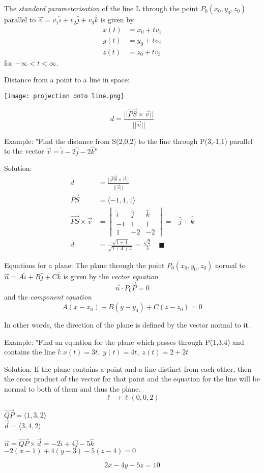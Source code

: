 \documentclass[12pt]{article}
\begin{document}
The \emph{standard parameterisation} of the line L through the point $P_0 (x_0, y_0, z_0)$ parallel to $\vec{v} = v_1 \hat{i} + v_2 \hat{j} + v_3 \hat{k}$ is given by 
\begin{align*}
    x(t) &= x_0 + tv_1\\
    y(t) &= y_0 + tv_2\\
    z(t) &= z_0 + tv_3
\end{align*}
for $-\infty < t < \infty$.

Distance from a point to a line in space:
\begin{center}
    \texttt{[image: projection onto line.png]}
\end{center}
$$d = \frac{||\vec{PS} \times \vec{v}||}{||\vec{v}||}$$

Example:
"Find the distance from S(2,0,2) to the line through P(3,-1,1) parallel to the vector $\vec{v} = \hat{i} - 2\hat{j} - 2\hat{k}$"

Solution:
\begin{align*}
    d &= \frac{||\vec{PS} \times \vec{v}||}{||\vec{v}||}\\
    \vec{PS} &= \langle -1,1,1\rangle\\
    \vec{PS} \times \vec{v} &= \begin{vmatrix}
        \hat{i} & \hat{j} & \hat{k}\\
        -1 & 1 & 1\\
        1 & -2 & -2
    \end{vmatrix} = -\hat{j} + \hat{k}\\
    d &= \frac{\sqrt{1 + 1}}{\sqrt{1 + 4 +4}} = \frac{\sqrt{2}}{3} \quad \blacksquare
\end{align*}

Equations for a plane: 
The plane through the point $P_0 (x_0, y_0, z_0)$ normal to $\vec{n} = A\hat{i} + B\hat{j} + C \hat{k}$ is given by the \emph{vector equation}
$$\vec{n} \cdot \vec{P_0 P} = 0$$
and the \emph{component equation}
$$A(x - x_0)+B(y-y_0)+C(z-z_0) = 0$$

In other words, the direction of the plane is defined by the vector normal to it. 

Example: 
"Find an equation for the plane which passes through P(1,3,4) and contains the line $l: x(t) = 3t,\; y(t) = 4t,\; z(t)=2+2t$

Solution: 
If the plane contains a point and a line distinct from each other, then the cross product of the vector for that point and the equation for the line will be normal to both of them and thus the plane. 
$$\ell \rightarrow \ell(0, 0, 2)$$
\begin{center}
    $\vec{QP} = \langle 1,3,2\rangle$\\
    $\vec{d} = \langle 3,4,2\rangle$\\
\end{center}
\begin{center}
    $\vec{n} = \vec{QP} \times \vec{d} = -2\hat{i} + 4\hat{j}-5\hat{k}$\\
    $-2(x-1)+4(y-3)-5(z-4) = 0$\\
\end{center}
$$2x -4y - 5z = 10$$
\end{document}
